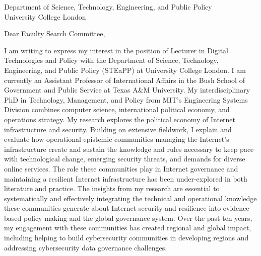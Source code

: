 \documentclass[11pt]{letter}
\begin{document}
\begin{letter}
{
  Department of Science, Technology, Engineering, and Public Policy \\ 
  University College London
}

\opening{Dear Faculty Search Committee,}

I am writing to express my interest in the position of Lecturer in Digital Technologies and Policy with the Department of Science, Technology, Engineering, and Public Policy (STEaPP) at University College London.  
%
I am currently an Assistant Professor of International Affairs in the Bush School of Government and Public Service at Texas A\&M University.  
%
My interdisciplinary PhD in Technology, Management, and Policy from MIT's Engineering Systems Division combines computer science, international political economy, and operations strategy.
%
My research explores the political economy of Internet infrastructure and security.
%
Building on extensive fieldwork, I explain and evaluate how operational epistemic communities managing the Internet's infrastructure create and sustain the knowledge and rules necessary to keep pace with technological change, emerging security threats, and demands for diverse online services.
%
The role these communities play in Internet governance and maintaining a resilient Internet infrastructure has been under-explored in both literature and practice.
%
%
%
The insights from my research are essential to systematically and effectively integrating the technical and operational knowledge these communities generate about Internet security and resilience into evidence-based policy making and the global governance system.
%
Over the past ten years, my engagement with these communities has created  regional and global impact, including helping to build cybersecurity communities in developing regions and addressing cybersecurity data governance challenges.
%



\end{letter}
\end{document}
